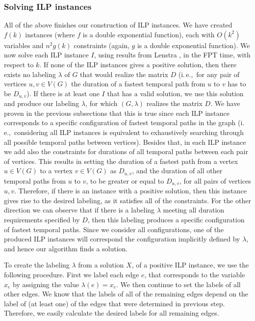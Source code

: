 \documentclass[a4paper,UKenglish,cleveref, autoref, thm-restate]{lipics-v2021}
\newcommand{\ie}{i.\,e.,\ }
\begin{document}
\subsubsection{Solving ILP instances}
All of the above finishes our construction of ILP instances.
We have created $f(k)$ instances (where $f$ is a double exponential function), 
each with $O(k^2)$ variables and $n^2 g(k)$ constraints (again, $g$ is a double exponential function).
We now solve each ILP instance $I$, using results from Lenstra \cite{Lenstra1983Integer},
in the FPT time, with respect to $k$.
%
If none of the ILP instances gives a positive solution, then there exists no labeling $\lambda$ of $G$ that would realize the matrix $D$ (\ie for any pair of vertices $u,v \in V(G)$ the duration of a fastest temporal path from $u$ to $v$ has to be $D_{u,v}$).
If there is at least one $I$ that has a valid solution, 
we use this solution and produce our labeling $\lambda$, for which $(G,\lambda)$ realizes the matrix $D$.
We have proven in the previous subsections that this is true since each ILP instance corresponds to a specific configuration of fastest temporal paths in the graph (\ie considering all ILP instances is equivalent to exhaustively searching through all possible temporal paths between vertices).
Besides that, in each ILP instance we add also the constraints for durations of all temporal paths between each pair of vertices.
This results in setting the duration of a fastest path from a vertex $u \in V(G)$ to a vertex $v \in V(G)$ as $D_{u,v}$,
and the duration of all other temporal paths from $u$ to $v$, to be greater or equal to $D_{u,v}$,
for all pairs of vertices $u,v$.
Therefore, if there is an instance with a positive solution, then this instance gives rise to the desired labeling, as it satisfies all of the constraints.
For the other direction we can observe that if there is a labeling $\lambda$ meeting all duration requirements specified by $D$, then this labeling produces a specific configuration of fastest temporal paths. Since we consider all configurations, one of the produced ILP instances will correspond the configuration implicitly defined by $\lambda$, and hence our algorithm finds a solution.

To create the labeling $\lambda$ from a solution $X$, of a positive ILP instance,
we use the following procedure.
First we
label each edge $e$, that corresponds to the variable $x_e$
by assigning the value $\lambda(e) = x_e$.
We then continue to set the labels of all other edges. 
We know that the labels of all of the remaining edges depend on the label of (at least one) of the edges that were determined in previous step. 
Therefore, we easily calculate the desired labels for all remaining edges.
\end{document}
